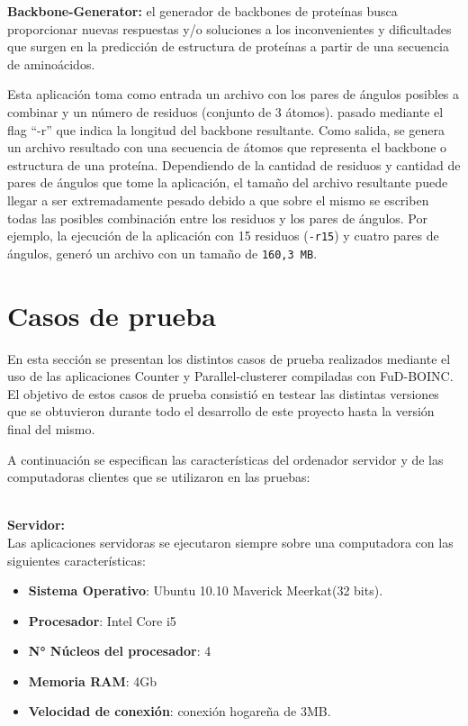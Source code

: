 \textbf{Backbone-Generator:}\label{subsection:bbgen} el generador de backbones de proteínas busca proporcionar nuevas respuestas y/o soluciones a los inconvenientes y dificultades que surgen en la predicción de estructura de proteínas a partir de una secuencia de aminoácidos.

Esta aplicación toma como entrada un archivo con los pares de ángulos posibles a combinar y un número de residuos (conjunto de 3 átomos). pasado mediante el flag ``-r'' que indica la longitud del backbone resultante. Como salida, se genera un archivo resultado con una secuencia de átomos que representa el backbone o estructura de una proteína. Dependiendo de la cantidad de residuos y cantidad de pares de ángulos que tome la aplicación, el tamaño del archivo resultante puede llegar a ser extremadamente pesado debido a que sobre el mismo se escriben todas las posibles combinación entre los residuos y los pares de ángulos. Por ejemplo, la ejecución de la aplicación con 15 residuos (\texttt{-r15}) y cuatro pares de ángulos, generó un archivo con un tamaño de \texttt{160,3 MB}.


\section{Casos de prueba}

En esta sección se presentan los distintos casos de prueba realizados mediante el uso de las aplicaciones Counter y Parallel-clusterer compiladas con FuD-BOINC. 
El objetivo de estos casos de prueba consistió en testear las distintas versiones que se obtuvieron durante todo el desarrollo de este proyecto hasta la versión final del mismo.

A continuación se especifican las características del ordenador servidor y de las computadoras clientes que se utilizaron en las pruebas:

\textbf{\\Servidor:}\\

Las aplicaciones servidoras se ejecutaron siempre sobre una computadora con las siguientes características:

\begin{itemize}
 \item \textbf{Sistema Operativo}: Ubuntu 10.10 Maverick Meerkat(32 bits).
 \item \textbf{Procesador}: Intel Core i5
 \item \textbf{N° Núcleos del procesador}: 4
 \item \textbf{Memoria RAM}: 4Gb
 \item \textbf{Velocidad de conexión}: conexión hogareña de 3MB.
\end{itemize}

